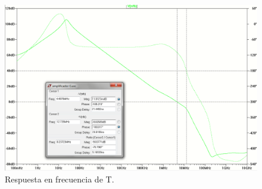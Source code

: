 \begin{figure}[H]
\centering
\includegraphics[width=1\textwidth]{img/margen_fase_ganancia.png}
\caption{Respuesta en frecuencia de T.}
\label{simul_estab}
\end{figure}



\medskip
